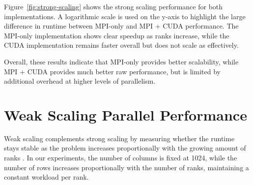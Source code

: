 \documentclass[10pt,twocolumn]{article}
\begin{document}
Figure~\ref{fig:strong-scaling} shows the strong scaling performance for both implementations. A logarithmic scale is used on the y-axis to highlight the large difference in runtime between MPI-only and MPI + CUDA performance. The MPI-only implementation shows clear speedup as ranks increase, while the CUDA implementation remains faster overall but does not scale as effectively. 

Overall, these results indicate that MPI-only provides better scalability, while MPI + CUDA provides much better raw performance, but is limited by additional overhead at higher levels of parallelism.

\FloatBarrier
\section*{Weak Scaling Parallel Performance}

Weak scaling complements strong scaling by measuring whether the runtime stays stable as the problem increases proportionally with the growing amount of ranks \cite{llnlmpi}. In our experiments, the number of columns is fixed at 1024, while the number of rows increases proportionally with the number of ranks, maintaining a constant workload per rank.

\begin{table}[!tbp]
\centering
{}
\caption{Weak scaling results for MPI only (columns fixed at 1024).}
\end{table}
\end{document}
